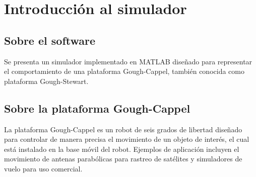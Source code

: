 \chapter{Introducción al simulador}

\section{Sobre el software}
Se presenta un simulador implementado en MATLAB diseñado para 
representar el comportamiento de una plataforma Gough-Cappel, 
también conocida como
plataforma Gough-Stewart.

\section{Sobre la plataforma Gough-Cappel}

La plataforma Gough-Cappel es un robot de seis grados de libertad diseñado para 
controlar de manera precisa el movimiento de un objeto de interés, el cual está 
instalado en la base móvil del robot. Ejemplos de aplicación incluyen el 
movimiento de antenas parabólicas para rastreo de satélites y
simuladores de vuelo para uso comercial.


